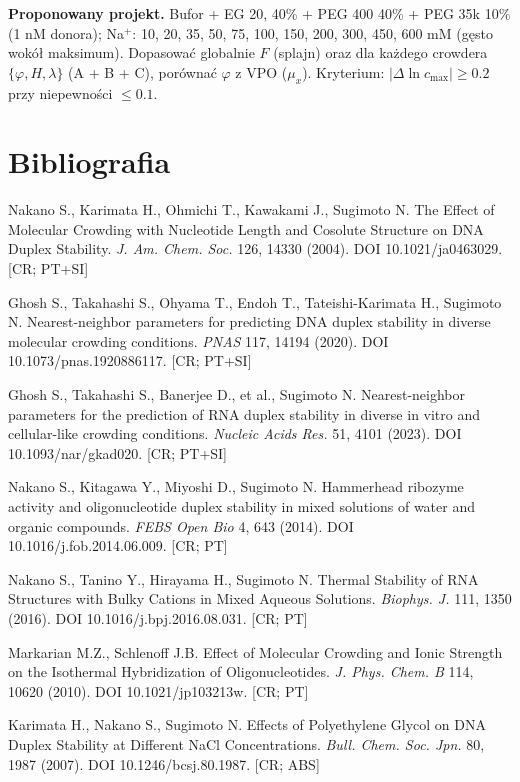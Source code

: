 \documentclass[11pt,a4paper]{article}
\begin{document}
\textbf{Proponowany projekt.} Bufor + EG 20, 40\% + PEG 400 40\% + PEG 35k 10\% (1 nM donora); Na$^+$: 10, 20, 35, 50, 75, 100, 150, 200, 300, 450, 600 mM (gęsto wokół maksimum). Dopasować globalnie $F$ (splajn) oraz dla każdego crowdera $\{\varphi,H,\lambda\}$ (A + B + C), porównać $\varphi$ z VPO ($\mu_x$). Kryterium: $|\Delta\ln c_\text{max}|\ge0.2$ przy niepewności $\le0.1$.

\section*{Bibliografia}
\small
\begin{enumerate}[label={[\arabic*]},ref={\arabic*},leftmargin=*,itemsep=0pt]
\item\label{b:nak04} Nakano S., Karimata H., Ohmichi T., Kawakami J., Sugimoto N. The Effect of Molecular Crowding with Nucleotide Length and Cosolute Structure on DNA Duplex Stability. \emph{J. Am. Chem. Soc.} 126, 14330 (2004). DOI 10.1021/ja0463029. [CR; PT+SI]
\item\label{b:gh20} Ghosh S., Takahashi S., Ohyama T., Endoh T., Tateishi-Karimata H., Sugimoto N. Nearest-neighbor parameters for predicting DNA duplex stability in diverse molecular crowding conditions. \emph{PNAS} 117, 14194 (2020). DOI 10.1073/pnas.1920886117. [CR; PT+SI]
\item\label{b:gh23} Ghosh S., Takahashi S., Banerjee D., et al., Sugimoto N. Nearest-neighbor parameters for the prediction of RNA duplex stability in diverse in vitro and cellular-like crowding conditions. \emph{Nucleic Acids Res.} 51, 4101 (2023). DOI 10.1093/nar/gkad020. [CR; PT+SI]
\item\label{b:nak14} Nakano S., Kitagawa Y., Miyoshi D., Sugimoto N. Hammerhead ribozyme activity and oligonucleotide duplex stability in mixed solutions of water and organic compounds. \emph{FEBS Open Bio} 4, 643 (2014). DOI 10.1016/j.fob.2014.06.009. [CR; PT]
\item\label{b:nak16} Nakano S., Tanino Y., Hirayama H., Sugimoto N. Thermal Stability of RNA Structures with Bulky Cations in Mixed Aqueous Solutions. \emph{Biophys. J.} 111, 1350 (2016). DOI 10.1016/j.bpj.2016.08.031. [CR; PT]
\item\label{b:mark} Markarian M.Z., Schlenoff J.B. Effect of Molecular Crowding and Ionic Strength on the Isothermal Hybridization of Oligonucleotides. \emph{J. Phys. Chem. B} 114, 10620 (2010). DOI 10.1021/jp103213w. [CR; PT]
\item\label{b:kar07} Karimata H., Nakano S., Sugimoto N. Effects of Polyethylene Glycol on DNA Duplex Stability at Different NaCl Concentrations. \emph{Bull. Chem. Soc. Jpn.} 80, 1987 (2007). DOI 10.1246/bcsj.80.1987. [CR; ABS]

\end{enumerate}
\end{document}
